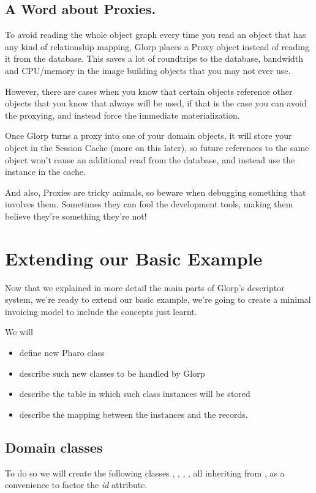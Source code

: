\documentclass[10pt,twoside,english]{_support/latex/sbabook/sbabook}
\begin{document}
\section{A Word about Proxies.}
To avoid reading the whole object graph every time you read an object that
has any kind of relationship mapping, Glorp places a Proxy object instead
of reading it from the database.
This saves a lot of roundtrips to the database, bandwidth and CPU/memory
in the image building objects that you may not ever use.

However, there are cases when you know that certain objects reference
other objects that you know that always will be used, if that is
the case you can avoid the proxying, and instead force the immediate
materialization.

Once Glorp turns a proxy into one of your domain objects, it will store
your object in the Session Cache (more on this later), so future references
to the same object won't cause an additional read from the database, and instead
use the instance in the cache.

And also, Proxies are tricky animals, so beware when debugging something
that involves them. Sometimes they can fool the development tools, making
them believe they're something they're not!
\chapter{Extending our Basic Example}
Now that we explained in more detail the main parts of Glorp's descriptor system,
we're ready to extend our basic example, we're going to create a minimal
invoicing model to include the concepts just learnt.

We will 

\begin{itemize}
\item define new Pharo class
\item describe such new classes to be handled by Glorp
\item describe the table in which such class instances will be stored
\item describe the mapping between the instances and the records.
\end{itemize}
\section{Domain classes}
To do so we will create the following classes ,
, , , all inheriting from
, as a convenience to factor the \textit{id} attribute.
\end{document}

